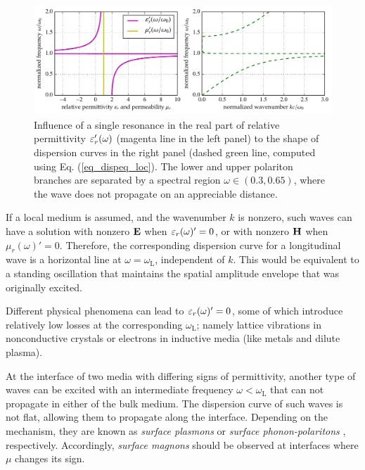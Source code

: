 \begin{figure}[t] \caption{Influence of a single resonance in the real part of relative permittivity $\varepsilon_r'(\omega)$ (magenta line in the left panel) to the shape of dispersion curves in the right panel (dashed green line, computed using Eq. (\ref{eq_dispeq_loc}). The lower and upper polariton branches are separated by a spectral region $\omega \in (0.3, 0.65)$, where the wave does not propagate on an appreciable distance.} \label{fg_dcsimpleel} \centering 
	\includegraphics[width=\textwidth]{img/dispersion_landau_lifshitz/dispersion_simple_el.pdf}
\end{figure}
If a local medium is assumed, and the wavenumber $k$ is nonzero, such waves can have a solution with nonzero $\mathbf{E}$ when $\varepsilon_r(\omega)' = 0$, or with nonzero $\mathbf{H}$ when $\mu_r(\omega)' = 0$. Therefore, the corresponding dispersion curve for a longitudinal wave is a horizontal line at $\omega = \omega_{\text{L}}$, independent of $k$. This would be equivalent to a standing oscillation that maintains the spatial amplitude envelope that was originally excited. 

Different physical phenomena can lead to $\varepsilon_r(\omega)' = 0$, some of which introduce relatively low losses at the corresponding $\omega_{\text{L}}$; namely lattice vibrations in nonconductive crystals or electrons in inductive media (like metals and dilute plasma). 

At the interface of two media with differing signs of permittivity, another type of waves can be excited with an intermediate frequency $\omega < \omega_{\text{L}}$ that can not propagate in either of the bulk medium. The dispersion curve of such waves is not flat, allowing them to propagate along the interface. Depending on the mechanism, they are known as  \textit{surface plasmons} or \textit{surface phonon-polaritons} \cite[p. 87]{klingshirn2007semiconductor}, respectively. Accordingly, \textit{surface magnons} should be observed at interfaces where $\mu$ changes its sign.
